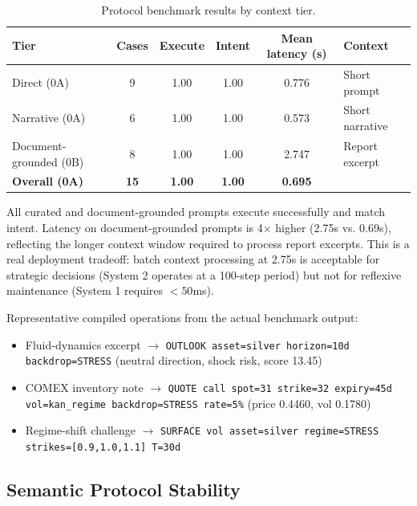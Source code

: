 \documentclass[11pt,a4paper]{article}
\begin{document}
\begin{table}[h]
\centering
\caption{Protocol benchmark results by context tier.}
\begin{tabular}{@{}lccccl@{}}
\toprule
Tier & Cases & Execute & Intent & Mean latency (s) & Context \\ \midrule
Direct (0A) & 9 & 1.00 & 1.00 & 0.776 & Short prompt \\
Narrative (0A) & 6 & 1.00 & 1.00 & 0.573 & Short narrative \\
Document-grounded (0B) & 8 & 1.00 & 1.00 & 2.747 & Report excerpt \\
\textbf{Overall (0A)} & \textbf{15} & \textbf{1.00} & \textbf{1.00} & \textbf{0.695} & \\
\bottomrule
\end{tabular}
\label{tab:protocol_results}
\end{table}

All curated and document-grounded prompts execute successfully and match intent. Latency on document-grounded prompts is 4$\times$ higher (2.75s vs. 0.69s), reflecting the longer context window required to process report excerpts. This is a real deployment tradeoff: batch context processing at 2.75s is acceptable for strategic decisions (System 2 operates at a 100-step period) but not for reflexive maintenance (System 1 requires $<50$ms).

Representative compiled operations from the actual benchmark output:
\begin{itemize}
  \item Fluid-dynamics excerpt $\to$ \texttt{OUTLOOK asset=silver horizon=10d backdrop=STRESS} (neutral direction, shock risk, score 13.45)
  \item COMEX inventory note $\to$ \texttt{QUOTE call spot=31 strike=32 expiry=45d vol=kan\_regime backdrop=STRESS rate=5\%} (price 0.4460, vol 0.1780)
  \item Regime-shift challenge $\to$ \texttt{SURFACE vol asset=silver regime=STRESS strikes=[0.9,1.0,1.1] T=30d}
\end{itemize}

\subsection{Semantic Protocol Stability}
\end{document}
